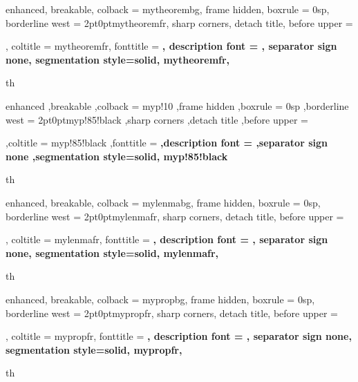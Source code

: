 
\setlength{\parindent}{1cm}


{
	enhanced,
	breakable,
	colback = mytheorembg,
	frame hidden,
	boxrule = 0sp,
	borderline west = {2pt}{0pt}{mytheoremfr},
	sharp corners,
	detach title,
	before upper = \tcbtitle\par\smallskip,
	coltitle = mytheoremfr,
	fonttitle = \bfseries\sffamily,
	description font = \mdseries,
	separator sign none,
	segmentation style={solid, mytheoremfr},
}
{th}


{
	enhanced
	,breakable
	,colback = myp!10
	,frame hidden
	,boxrule = 0sp
	,borderline west = {2pt}{0pt}{myp!85!black}
	,sharp corners
	,detach title
	,before upper = \tcbtitle\par\smallskip
	,coltitle = myp!85!black
	,fonttitle = \bfseries\sffamily
	,description font = \mdseries
	,separator sign none
	,segmentation style={solid, myp!85!black}
}
{th}


{
	enhanced,
	breakable,
	colback = mylenmabg,
	frame hidden,
	boxrule = 0sp,
	borderline west = {2pt}{0pt}{mylenmafr},
	sharp corners,
	detach title,
	before upper = \tcbtitle\par\smallskip,
	coltitle = mylenmafr,
	fonttitle = \bfseries\sffamily,
	description font = \mdseries,
	separator sign none,
	segmentation style={solid, mylenmafr},
}
{th}


{
	enhanced,
	breakable,
	colback = mypropbg,
	frame hidden,
	boxrule = 0sp,
	borderline west = {2pt}{0pt}{mypropfr},
	sharp corners,
	detach title,
	before upper = \tcbtitle\par\smallskip,
	coltitle = mypropfr,
	fonttitle = \bfseries\sffamily,
	description font = \mdseries,
	separator sign none,
	segmentation style={solid, mypropfr},
}
{th}


